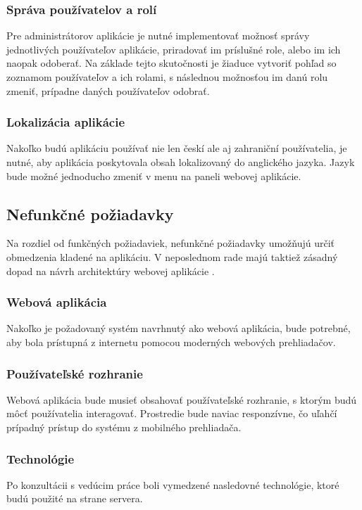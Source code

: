 \subsubsection{Správa používatelov a rolí}\label{sprava-pouzivatelov-a-roli}
Pre administrátorov aplikácie je nutné implementovať možnosť správy jednotlivých používateľov aplikácie, priradovať im príslušné role, alebo im ich naopak odoberať. Na základe tejto skutočnosti je žiaduce vytvoriť pohľad so zoznamom používateľov a ich rolami, s následnou možnosťou im danú rolu zmeniť, prípadne daných používateľov odobrať.

\subsubsection{Lokalizácia aplikácie}
Nakoľko budú aplikáciu používať nie len českí ale aj zahraniční používatelia, je nutné, aby aplikácia poskytovala obsah lokalizovaný do anglického jazyka. Jazyk bude možné jednoducho zmeniť v menu na paneli webovej aplikácie.

\subsection{Nefunkčné požiadavky}
Na rozdiel od funkčných požiadaviek, nefunkčné požiadavky umožňujú určiť obmedzenia kladené na aplikáciu. V neposlednom rade majú taktiež zásadný dopad na návrh architektúry webovej aplikácie \cite{co-su-pripady-pouzitia}.

\subsubsection{Webová aplikácia}
Nakoľko je požadovaný systém navrhnutý ako webová aplikácia, bude potrebné, aby bola prístupná z internetu pomocou moderných webových prehliadačov.

\subsubsection{Používateľské rozhranie}
Webová aplikácia bude musieť obsahovať používateľské rozhranie, s ktorým budú môcť používatelia interagovať.
Prostredie bude naviac responzívne, čo uľahčí prípadný prístup do systému z mobilného prehliadača.

\subsubsection{Technológie}
Po konzultácii s vedúcim práce boli vymedzené nasledovné technológie, ktoré budú použité na strane servera.

